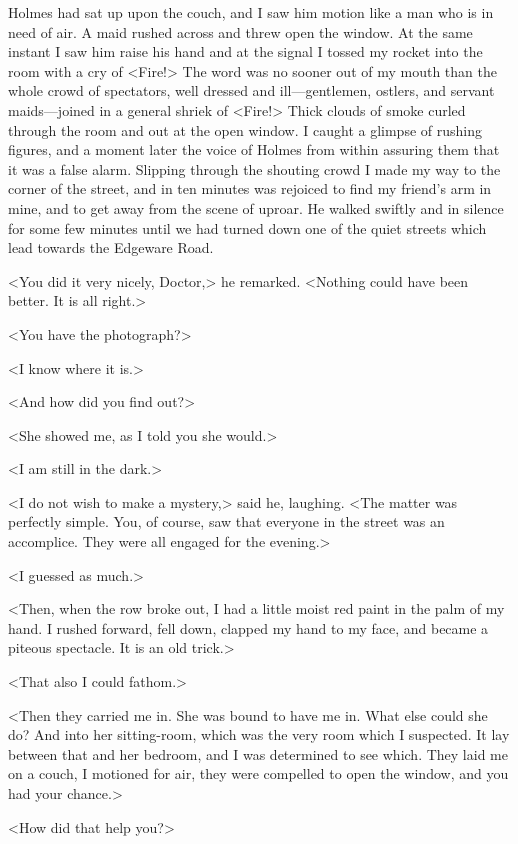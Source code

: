 Holmes had sat up upon the couch, and I saw him motion like a man who is in need of air. A maid rushed across and threw open the window. At the same instant I saw him raise his hand and at the signal I tossed my rocket into the room with a cry of <Fire!> The word was no sooner out of my mouth than the whole crowd of spectators, well dressed and ill—gentlemen, ostlers, and servant maids—joined in a general shriek of <Fire!> Thick clouds of smoke curled through the room and out at the open window. I caught a glimpse of rushing figures, and a moment later the voice of Holmes from within assuring them that it was a false alarm. Slipping through the shouting crowd I made my way to the corner of the street, and in ten minutes was rejoiced to find my friend's arm in mine, and to get away from the scene of uproar. He walked swiftly and in silence for some few minutes until we had turned down one of the quiet streets which lead towards the Edgeware Road.

<You did it very nicely, Doctor,> he remarked. <Nothing could have been better. It is all right.>

<You have the photograph?>

<I know where it is.>

<And how did you find out?>

<She showed me, as I told you she would.>

<I am still in the dark.>

<I do not wish to make a mystery,> said he, laughing. <The matter was perfectly simple. You, of course, saw that everyone in the street was an accomplice. They were all engaged for the evening.>

<I guessed as much.>

<Then, when the row broke out, I had a little moist red paint in the palm of my hand. I rushed forward, fell down, clapped my hand to my face, and became a piteous spectacle. It is an old trick.>

<That also I could fathom.>

<Then they carried me in. She was bound to have me in. What else could she do? And into her sitting-room, which was the very room which I suspected. It lay between that and her bedroom, and I was determined to see which. They laid me on a couch, I motioned for air, they were compelled to open the window, and you had your chance.>

<How did that help you?>

